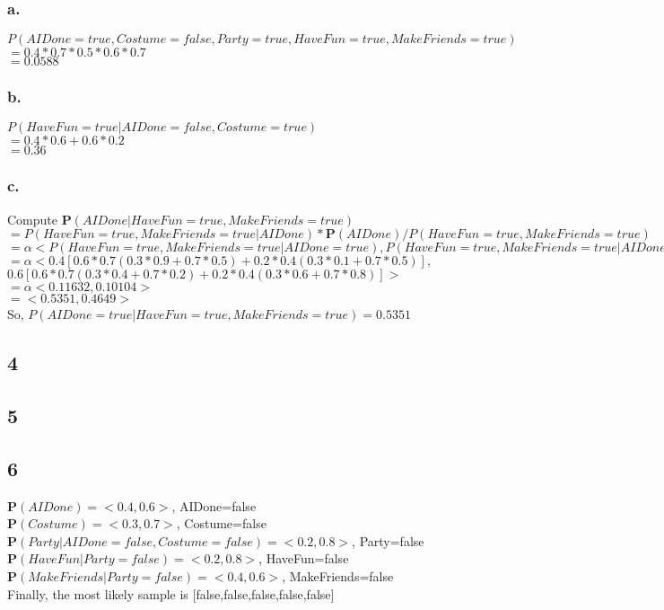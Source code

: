 \documentclass{article}
\begin{document}
            \subsubsection{a.}
                \par $P(AIDone=true,Costume=false,Party=true,HaveFun=true,MakeFriends=true)$
                \\$= 0.4*0.7*0.5*0.6*0.7$
                \\$= 0.0588$
            \subsubsection{b.}
                \par $P(HaveFun=true|AIDone=false,Costume=true)$
                \\$= 0.4*0.6+0.6*0.2$
                \\$= 0.36$
            \subsubsection{c.}
                \par Compute \textbf{P}$(AIDone|HaveFun=true,MakeFriends=true)$
                \\$= P(HaveFun=true,MakeFriends=true|AIDone)*\textbf{P}(AIDone)/P(HaveFun=true, MakeFriends=true)$
                \\$= \alpha<P(HaveFun=true,MakeFriends=true|AIDone=true),P(HaveFun=true,MakeFriends=true|AIDone=false)>$
                \\$= \alpha<0.4[0.6*0.7(0.3*0.9+0.7*0.5)+0.2*0.4(0.3*0.1+0.7*0.5)],$
                \\$0.6[0.6*0.7(0.3*0.4+0.7*0.2)+0.2*0.4(0.3*0.6+0.7*0.8)]>$
                \\$= \alpha<0.11632,0.10104>$
                \\$= <0.5351, 0.4649>$
                \\So, $P(AIDone=true|HaveFun=true,MakeFriends=true)=0.5351$
        \subsection{4}
        \subsection{5}
        \subsection{6}
            \textbf{P}$(AIDone)=<0.4,0.6>$, AIDone=false
            \\\textbf{P}$(Costume)=<0.3,0.7>$, Costume=false
            \\\textbf{P}$(Party|AIDone=false, Costume=false)=<0.2,0.8>$, Party=false
            \\\textbf{P}$(HaveFun|Party=false)=<0.2,0.8>$, HaveFun=false
            \\\textbf{P}$(MakeFriends|Party=false)=<0.4,0.6>$, MakeFriends=false
            \\Finally, the most likely sample is [false,false,false,false,false]
\end{document}
